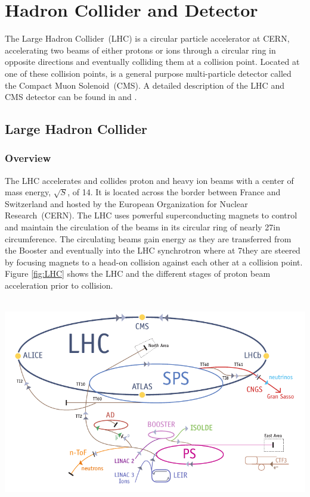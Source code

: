 \chapter{Hadron Collider and Detector}
The Large Hadron Collider~(LHC) is a circular particle accelerator at CERN, accelerating two beams of either protons or ions through a circular ring in opposite directions and eventually colliding them at a collision point. Located at one of these collision points, is a general purpose multi-particle detector called the Compact Muon Solenoid~(CMS). A detailed description of the LHC and CMS detector can be found in \cite{LHC} and \cite{CMSTDR,CMSTDR1}.
\section{Large Hadron Collider}
\subsection{Overview}
The LHC accelerates and collides proton and heavy ion beams with a center of mass energy, $\displaystyle{\sqrt{S}}$, of 14\TeV.  It is located across the border between France and Switzerland and hosted by the European Organization for Nuclear Research~(CERN). The LHC uses powerful superconducting magnets to control and maintain the circulation of the beams in its circular ring of nearly 27\km in circumference. The circulating beams gain energy as they are transferred from the Booster and eventually into the LHC synchrotron where at 7\TeV they are steered by focusing magnets to a head-on collision against each other at a collision point. Figure \ref{fig:LHC} shows the LHC and the different stages of proton beam acceleration prior to collision.
\begin{center}
\mbox{
\includegraphics[width=6in]{THESISPLOTS/The_LHC.png}}
\label{fig:LHC}
\end{center}
